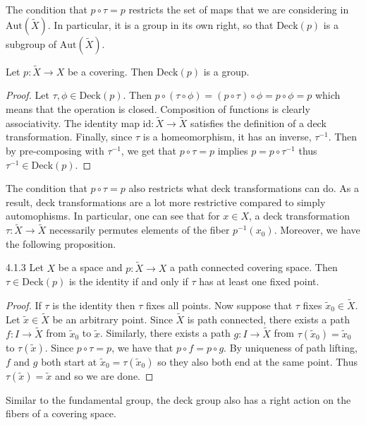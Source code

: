 \documentclass[a4paper]{article}
\begin{document}
The condition that $p\circ\tau=p$ restricts the set of maps that we are considering in $\text{Aut}(\tilde{X})$. In particular, it is a group in its own right, so that $\text{Deck}(p)$ is a subgroup of $\text{Aut}(\tilde{X})$. 

\begin{prp}{}{} Let $p:\tilde{X}\to X$ be a covering. Then $\text{Deck}(p)$ is a group. \tcbline
\begin{proof}
Let $\tau,\phi\in\text{Deck}(p)$. Then $p\circ(\tau\circ\phi)=(p\circ\tau)\circ\phi=p\circ\phi=p$ which means that the operation is closed. Composition of functions is clearly associativity. The identity map $\text{id}:\tilde{X}\to\tilde{X}$ satisfies the definition of a deck transformation. Finally, since $\tau$ is a homeomorphism, it has an inverse, $\tau^{-1}$. Then by pre-composing with $\tau^{-1}$, we get that $p\circ\tau=p$ implies $p=p\circ\tau^{-1}$ thus $\tau^{-1}\in\text{Deck}(p)$. 
\end{proof}
\end{prp}

The condition that $p\circ\tau=p$ also restricts what deck transformations can do. As a result, deck transformations are a lot more restrictive compared to simply automophisms. In particular, one can see that for $x\in X$, a deck transformation $\tau:\tilde{X}\to\tilde{X}$ necessarily permutes elements of the fiber $p^{-1}(x_0)$. Moreover, we have the following proposition. 

\begin{prp}{}{4.1.3} Let $X$ be a space and $p:\tilde{X}\to X$ a path connected covering space. Then $\tau\in\text{Deck}(p)$ is the identity if and only if $\tau$ has at least one fixed point. \tcbline
\begin{proof}
If $\tau$ is the identity then $\tau$ fixes all points. Now suppose that $\tau$ fixes $\tilde{x}_0\in\tilde{X}$. Let $\tilde{x}\in\tilde{X}$ be an arbitrary point. Since $\tilde{X}$ is path connected, there exists a path $f:I\to\tilde{X}$ from $\tilde{x}_0$ to $\tilde{x}$. Similarly, there exists a path $g:I\to\tilde{X}$ from $\tau(\tilde{x}_0)=\tilde{x}_0$ to $\tau(\tilde{x})$. Since $p\circ\tau=p$, we have that $p\circ f=p\circ g$. By uniqueness of path lifting, $f$ and $g$ both start at $\tilde{x}_0=\tau(\tilde{x}_0)$ so they also both end at the same point. Thus $\tau(\tilde{x})=\tilde{x}$ and so we are done. 
\end{proof}
\end{prp}

Similar to the fundamental group, the deck group also has a right action on the fibers of a covering space. 
\end{document}
